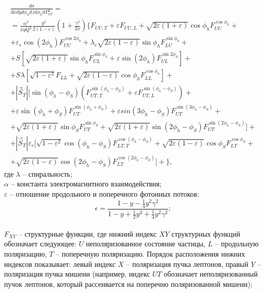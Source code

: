 \documentclass{extreport}
\begin{document}
\begin{multline} 
	\label{sigma}
	\frac{d\sigma}{dx dy d \phi_S dz d \phi_{h} dP^{2}_{h T}} = \\
	= \frac{\alpha^2}{xy Q^{2}} \frac{y^2}{2 (1 - \varepsilon)} \left(1 + \frac{\gamma^2}{2x} \right)
	\Biggl \lbrace F_{U U, T} +
	\varepsilon F_{U U, L} +
	\sqrt{2 \varepsilon (1 + \varepsilon)} \cos \phi_h F_{UU}^{\cos \phi_h} + \\
	+ \varepsilon_e \cos(2\phi_h) F_{U U}^{\cos 2\phi_h} +
	\lambda_e \sqrt{2 \varepsilon (1 - \varepsilon)} \sin \phi_h F_{L U}^{\sin \phi_h} + \\
	+ S_{} \left [ \sqrt{2 \varepsilon (1 + \varepsilon)} \sin \phi_h F_{UL}^{\sin \phi_h} +
	\varepsilon \sin(2\phi_h) F_{UL}^{\sin 2\phi_h} \right] + \\
	+ S_{} \lambda \left [ \sqrt{1 - \varepsilon^2} F_{L L} +
	\sqrt{2 \varepsilon (1 - \varepsilon)} \cos \phi_h F_{LL}^{\cos \phi_h} \right] + \\
	+ |\vec S_{T}| \Biggl[ \sin(\phi_h - \phi_S) \left(F_{U T, T}^{\sin(\phi_h - \phi_S)} +
	\varepsilon F_{UT, L}^{\sin(\phi_h - \phi_S)} \right) + \\
	+ \varepsilon \sin(\phi_h + \phi_S) F_{U T}^{\sin (\phi_h + \phi_S)} +
	\varepsilon sin (3\phi_h - \phi_S) F_{UT}^{\sin (3\phi_h - \phi_S)} + \\
	+ \sqrt{2 \varepsilon (1 + \varepsilon)} \sin \phi_S F_{UT}^{\sin \phi_S} +
	\sqrt{2 \varepsilon (1 + \varepsilon)} \sin(2\phi_h - \phi_S) F_{UT}^{\sin(2\phi_h - \phi_S)}  \Biggr] + \\
	+ |\vec S_{T}| \varepsilon_e \Biggl[ \sqrt{1 - \varepsilon^2} \cos(\phi_h - \phi_S) F_{LT, T}^{\cos(\phi_h - \phi_S)} +
	\sqrt{2 \varepsilon (1 - \varepsilon)} \cos \phi_S F_{LT}^{\cos \phi_S} + \\
	+ \sqrt{2 \varepsilon (1 - \varepsilon)} \cos(2\phi_h - \phi_S) F_{LT}^{\cos(2\phi_h - \phi_S)}  \Biggr] + \Biggr \rbrace,
\end{multline}
где $\lambda$ -- спиральность; \\
$\alpha$ -- константа электромагнитного взаимодействия; \\
 $\varepsilon$ -- отношение продольного и поперечного фотонных потоков:
\begin{equation}
	\epsilon = \frac{1-y-\frac{1}{4}y^2\gamma^2}{1-y+\frac{1}{2} y^2 +\frac{1}{4}y^2\gamma^2};
\end{equation}
\\
$F_{XY}$ -- структурные функции, где нижний индекс $XY$ структурных функций обозначает следующее: $U$ неполяризованное состояние частицы, $L$ -- продольную поляризацию, $T$ -- поперечную поляризацию. Порядок расположения нижних индексов показывает: левый индекс $X$ -- поляризация пучка лептонов, правый $Y$ -- поляризация пучка мишени (например, индекс $UT$ обозначает неполяризованный пучок лептонов, который рассеивается на поперечно поляризованной мишени);
\end{document}
